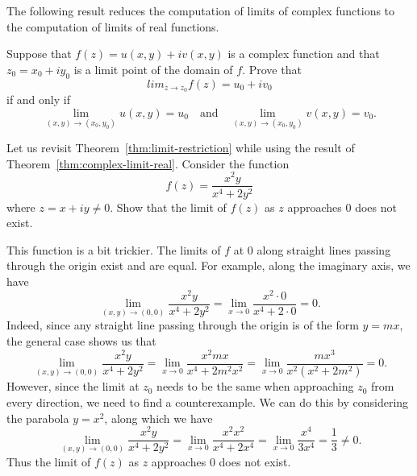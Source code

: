 The following result reduces the computation of limits of complex functions to the computation of limits of real functions. 

\begin{theorem}%
    Suppose that \(f(z) = u(x, y) + iv(x, y)\) is a complex function and that \(z_0 = x_0 + iy_0\) is a limit point of the domain of \(f\). Prove that
    \[
        lim_{z \to z_0} f(z) = u_0 + iv_0
    \]
    if and only if
    \[
        \lim_{(x, y) \to (x_0, y_0)} u(x, y) = u_0 \quad \text{and} \quad \lim_{(x, y) \to (x_0, y_0)} v(x, y) = v_0.
    \]
    \label{thm:complex-limit-real}
\end{theorem}

\begin{example}
    Let us revisit Theorem~\ref{thm:limit-restriction} while using the result of Theorem~\ref{thm:complex-limit-real}. Consider the function
    \[
        f(z) = \frac{x^2 y}{x^4 + 2y^2}
    \]
    where \(z = x + iy \neq 0\). Show that the limit of \(f(z)\) as \(z\) approaches \(0\) does not exist.

    \begin{solution}
        This function is a bit trickier. The limits of \(f\) at \(0\) along straight lines passing through the origin exist and are equal. For example, along the imaginary axis, we have
        \begin{equation*}
            \lim_{(x, y) \to (0, 0)} \frac{x^2 y}{x^4 + 2y^2} = \lim_{x \to 0} \frac{x^2 \cdot 0}{x^4 + 2\cdot 0} = 0.
        \end{equation*}
        Indeed, since any straight line passing through the origin is of the form \(y = mx\), the general case shows us that
        \begin{equation*}
            \lim_{(x, y) \to (0, 0)} \frac{x^2 y}{x^4 + 2y^2} = \lim_{x \to 0} \frac{x^2 mx}{x^4 + 2m^2 x^2} = \lim_{x \to 0} \frac{mx^3}{x^2(x^2 + 2m^2)} = 0.
        \end{equation*}
        However, since the limit at \(z_0\) needs to be the same when approaching \(z_0\) from every direction, we need to find a counterexample. We can do this by considering the parabola \(y = x^2\), along which we have
        \begin{equation*}
            \lim_{(x, y) \to (0, 0)} \frac{x^2 y}{x^4 + 2y^2} = \lim_{x \to 0} \frac{x^2 x^2}{x^4 +2x^4} = \lim_{x \to 0} \frac{x^4}{3x^4} = \frac{1}{3} \neq 0.
        \end{equation*}
        Thus the limit of \(f(z)\) as \(z\) approaches \(0\) does not exist.
    \end{solution}
\end{example}



